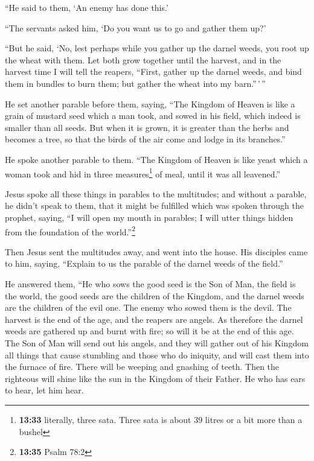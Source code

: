  ``He said to them, `An enemy has done this.'

``The servants asked him, `Do you want us to go and gather them up?'

 ``But he said, `No, lest perhaps while you gather up the
darnel weeds, you root up the wheat with them.  Let both
grow together until the harvest, and in the harvest time I will tell the
reapers, ``First, gather up the darnel weeds, and bind them in bundles
to burn them; but gather the wheat into my barn.''\,'\,''

 He set another parable before them, saying, ``The
Kingdom of Heaven is like a grain of mustard seed which a man took, and
sowed in his field,  which indeed is smaller than all
seeds. But when it is grown, it is greater than the herbs and becomes a
tree, so that the birds of the air come and lodge in its branches.''

 He spoke another parable to them. ``The Kingdom of
Heaven is like yeast which a woman took and hid in three
measures\footnote{\textbf{13:33} literally, three sata. Three sata is
  about 39 litres or a bit more than a bushel} of meal, until it was all
leavened.''

 Jesus spoke all these things in parables to the
multitudes; and without a parable, he didn't speak to them,
 that it might be fulfilled which was spoken through the
prophet, saying, ``I will open my mouth in parables; I will utter things
hidden from the foundation of the world.''\footnote{\textbf{13:35} Psalm
  78:2}

 Then Jesus sent the multitudes away, and went into the
house. His disciples came to him, saying, ``Explain to us the parable of
the darnel weeds of the field.''

 He answered them, ``He who sows the good seed is the Son
of Man,  the field is the world, the good seeds are the
children of the Kingdom, and the darnel weeds are the children of the
evil one.  The enemy who sowed them is the devil. The
harvest is the end of the age, and the reapers are angels.
 As therefore the darnel weeds are gathered up and burnt
with fire; so will it be at the end of this age.  The Son
of Man will send out his angels, and they will gather out of his Kingdom
all things that cause stumbling and those who do iniquity,
 and will cast them into the furnace of fire. There will
be weeping and gnashing of teeth.  Then the righteous
will shine like the sun in the Kingdom of their Father. He who has ears
to hear, let him hear.

